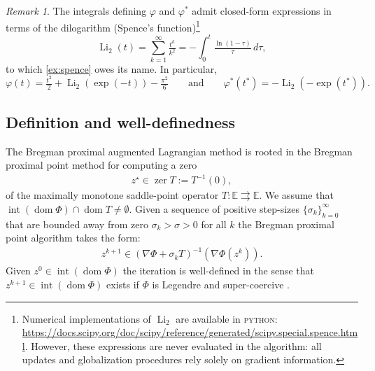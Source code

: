 \documentclass[11pt,onecolumn]{article}
\DeclareMathOperator{\Li}{Li}
\DeclareMathOperator{\dom}{dom}
\DeclareMathOperator{\intr}{int}
\DeclareMathOperator{\zer}{zer}
\theoremstyle{remark}
\newtheorem{remark}[remark]{Remark}
\begin{document}
\begin{remark}
The integrals defining $\varphi$ and $\varphi^*$ admit closed-form
expressions in terms of the dilogarithm (Spence’s function)\footnote{Numerical implementations of $\Li_2$ are available in \textsc{python}: \url{https://docs.scipy.org/doc/scipy/reference/generated/scipy.special.spence.html}. However, these expressions are never evaluated in the algorithm:
all updates and globalization procedures rely solely on gradient
information.}
\[
\Li_2(t)=\sum_{k=1}^\infty \tfrac{t^k}{k^2}
= -\int_0^t \tfrac{\ln(1-\tau)}{\tau}\,d\tau,
\]
to which \cref{ex:spence} owes its name.
In particular,
\[
\varphi(t)=\tfrac{t^2}{2}+\Li_2(\exp(-t))-\tfrac{\pi^2}{6}
\qquad \text{and} \qquad
\varphi^*(t^*)=-\Li_2(-\exp(t^*)).
\]
\end{remark}
\subsection{Definition and well-definedness}
The Bregman proximal augmented Lagrangian method is rooted in the Bregman proximal point method \cite{Eckstein93,eckstein1998approximate,burachik1998generalized,solodov2000inexact} for computing a zero
\begin{align}
z^\star \in \zer T:=T^{-1}(0),
\end{align}
of the maximally monotone saddle-point operator $T:\mathbb{E} \rightrightarrows \mathbb{E}$. 
We assume that $\intr (\dom \Phi) \cap \dom T \neq \emptyset$.
Given a sequence of positive step-sizes $\{\sigma_k\}_{k=0}^\infty$ that are bounded away from zero $\sigma_k > \sigma > 0$ for all $k$ the Bregman proximal point algorithm takes the form:
\begin{align} \label{eq:exact_bregman_ppa}
z^{k+1} \in (\nabla \Phi + \sigma_k T)^{-1}(\nabla \Phi(z^k)).
\end{align}
Given $z^0 \in \intr (\dom \Phi)$ the iteration is well-defined in the sense that $z^{k+1} \in \intr (\dom \Phi)$ exists if $\Phi$ is Legendre and super-coercive \cite[Proposition 3]{burachik1998generalized}.
\end{document}
